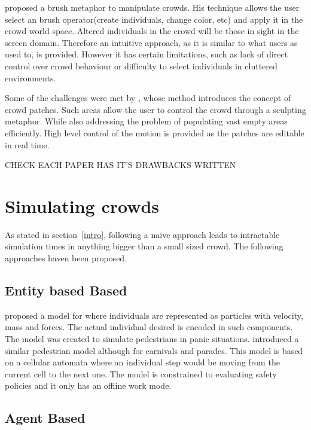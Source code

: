 \documentclass[11pt]{article}
\begin{document}
\begin{multicols}{2}
\cite{Ulicny2004} proposed a brush metaphor to manipulate crowds.
His technique allows the user select an brush operator(create individuals, change color, etc) and apply it in the crowd world space.
Altered individuals in the crowd will be those in sight in the screen domain.
Therefore an intuitive approach, as it is similar to what users as used to, is provided.
However it has certain limitations, such as lack of direct control over crowd behaviour or difficulty to select individuals in cluttered environments.

Some of the challenges were met by \cite{Jordao2014}, whose method introduces the concept of crowd patches.
Such areas allow the user to control the crowd through a sculpting metaphor.
While also addressing the problem of populating vast empty areas efficiently.
High level control of the motion is provided as the patches are editable in real time.

CHECK EACH PAPER HAS IT'S DRAWBACKS WRITTEN

\section{Simulating crowds}

As stated in section~\ref{intro}, following a naive approach leads to intractable simulation times in anything bigger than a small sized crowd.
The following approaches haven been proposed.

\subsection{Entity based Based}

\cite{Helbing2000} proposed a model for where individuals are represented as particles with velocity, mass and forces.
The actual individual desired is encoded in such components.
The model was created to simulate pedestrians in panic situations.
\cite{batty2003} introduced a similar pedestrian model although for carnivals and parades.
This model is based on a cellular automata where an individual step would be moving from the current cell to the next one.
The model is constrained to evaluating safety policies and it only has an offline work mode.

\subsection{Agent Based}


\end{multicols}
\end{document}
